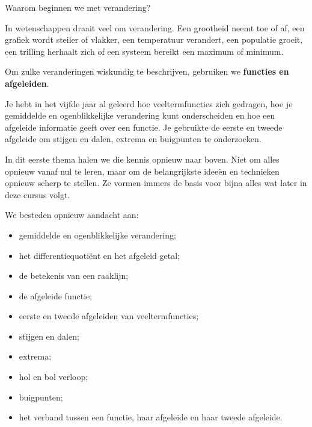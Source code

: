 \documentclass{xourse}
\begin{document}
\begin{hoofdstukoverzicht}
\end{hoofdstukoverzicht}

\begin{themaintro}{Waarom beginnen we met verandering?}

  In wetenschappen draait veel om verandering.
  Een grootheid neemt toe of af, een grafiek wordt steiler of vlakker,
  een temperatuur verandert, een populatie groeit, een trilling herhaalt zich
  of een systeem bereikt een maximum of minimum.
  
  Om zulke veranderingen wiskundig te beschrijven, gebruiken we
  \textbf{functies en afgeleiden}.
  
  Je hebt in het vijfde jaar al geleerd hoe veeltermfuncties zich gedragen,
  hoe je gemiddelde en ogenblikkelijke verandering kunt onderscheiden
  en hoe een afgeleide informatie geeft over een functie.
  Je gebruikte de eerste en tweede afgeleide om stijgen en dalen,
  extrema en buigpunten te onderzoeken.
  
  In dit eerste thema halen we die kennis opnieuw naar boven.
  Niet om alles opnieuw vanaf nul te leren, maar om de belangrijkste ideeën
  en technieken opnieuw scherp te stellen.
  Ze vormen immers de basis voor bijna alles wat later in deze cursus volgt.
  
  We besteden opnieuw aandacht aan:
  
  \begin{itemize}
  \item gemiddelde en ogenblikkelijke verandering;
  \item het differentiequotiënt en het afgeleid getal;
  \item de betekenis van een raaklijn;
  \item de afgeleide functie;
  \item eerste en tweede afgeleiden van veeltermfuncties;
  \item stijgen en dalen;
  \item extrema;
  \item hol en bol verloop;
  \item buigpunten;
  \item het verband tussen een functie, haar afgeleide en haar tweede afgeleide.
  \end{itemize}
  

\end{themaintro}
\end{document}
